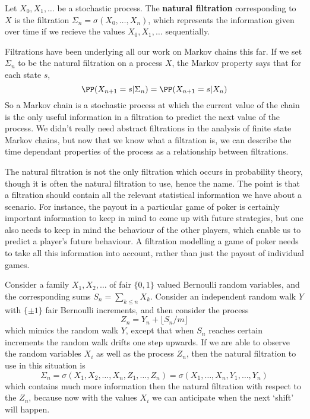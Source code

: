 \begin{example}
    Let $X_0, X_1, \dots$ be a stochastic process. The {\bf natural filtration} corresponding to $X$ is the filtration $\Sigma_n = \sigma(X_0, \dots, X_n)$, which represents the information given over time if we recieve the values $X_0, X_1, \dots$ sequentially.
\end{example}

Filtrations have been underlying all our work on Markov chains this far. If we set $\Sigma_n$ to be the natural filtration on a process $X$, the Markov property says that for each state $s$,
%
\[ \PP(X_{n+1} = s | \Sigma_n) = \PP(X_{n+1} = s | X_n) \]
%
So a Markov chain is a stochastic process at which the current value of the chain is the only useful information in a filtration to predict the next value of the process. We didn't really need abstract filtrations in the analysis of finite state Markov chains, but now that we know what a filtration is, we can describe the time dependant properties of the process as a relationship between filtrations.

The natural filtration is not the only filtration which occurs in probability theory, though it is often the natural filtration to use, hence the name. The point is that a filtration should contain all the relevant statistical information we have about a scenario. For instance, the payout in a particular game of poker is certainly important information to keep in mind to come up with future strategies, but one also needs to keep in mind the behaviour of the other players, which enable us to predict a player's future behaviour. A filtration modelling a game of poker needs to take all this information into account, rather than just the payout of individual games.

\begin{example}
    Consider a family $X_1, X_2, \dots$ of fair $\{ 0,1 \}$ valued Bernoulli random variables, and the corresponding sums $S_n = \sum_{k \leq n} X_k$. Consider an independent random walk $Y$ with $\{ \pm 1 \}$ fair Bernoulli increments, and then consider the process
    \[ Z_n = Y_n + \lfloor S_n/m \rfloor \]
    which mimics the random walk $Y$, except that when $S_n$ reaches certain increments the random walk drifts one step upwards. If we are able to observe the random variables $X_i$ as well as the process $Z_n$, then the natural filtration to use in this situation is
    \[ \Sigma_n = \sigma(X_1,X_2,\dots,X_n,Z_1, \dots, Z_n) = \sigma(X_1,\dots,X_n,Y_1,\dots,Y_n) \]
    which contains much more information then the natural filtration with respect to the $Z_n$, because now with the values $X_i$ we can anticipate when the next `shift' will happen.
\end{example}

